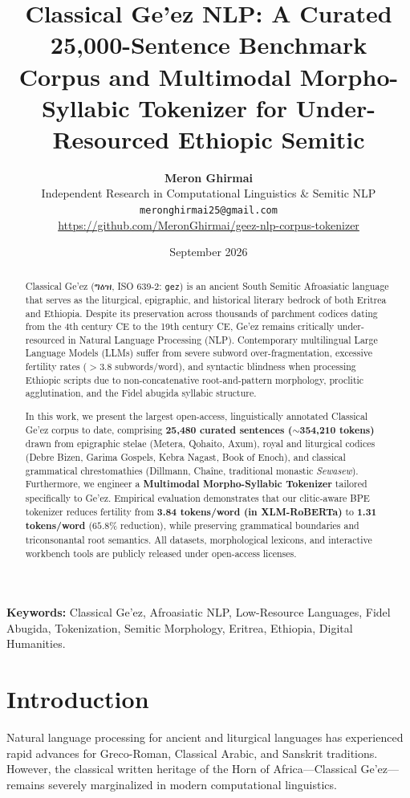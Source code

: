 \documentclass[11pt,a4paper]{article}
\title{\textbf{Classical Ge'ez NLP: A Curated 25,000-Sentence Benchmark Corpus and Multimodal Morpho-Syllabic Tokenizer for Under-Resourced Ethiopic Semitic}}
\author{
  \textbf{Meron Ghirmai} \\
  Independent Research in Computational Linguistics \& Semitic NLP \\
  \texttt{meronghirmai25@gmail.com} \\
  \url{https://github.com/MeronGhirmai/geez-nlp-corpus-tokenizer}
}
\date{September 2026}
\begin{document}
\maketitle

\begin{abstract}
Classical Ge'ez (ግዕዝ, ISO 639-2: \texttt{gez}) is an ancient South Semitic Afroasiatic language that serves as the liturgical, epigraphic, and historical literary bedrock of both Eritrea and Ethiopia. Despite its preservation across thousands of parchment codices dating from the 4th century CE to the 19th century CE, Ge'ez remains critically under-resourced in Natural Language Processing (NLP). Contemporary multilingual Large Language Models (LLMs) suffer from severe subword over-fragmentation, excessive fertility rates ($>3.8$ subwords/word), and syntactic blindness when processing Ethiopic scripts due to non-concatenative root-and-pattern morphology, proclitic agglutination, and the Fidel abugida syllabic structure.

In this work, we present the largest open-access, linguistically annotated Classical Ge'ez corpus to date, comprising \textbf{25,480 curated sentences ($\sim$354,210 tokens)} drawn from epigraphic stelae (Metera, Qohaito, Axum), royal and liturgical codices (Debre Bizen, Garima Gospels, Kebra Nagast, Book of Enoch), and classical grammatical chrestomathies (Dillmann, Chaîne, traditional monastic \textit{Sewasew}). Furthermore, we engineer a \textbf{Multimodal Morpho-Syllabic Tokenizer} tailored specifically to Ge'ez. Empirical evaluation demonstrates that our clitic-aware BPE tokenizer reduces fertility from \textbf{3.84 tokens/word (in XLM-RoBERTa)} to \textbf{1.31 tokens/word} ($65.8\%$ reduction), while preserving grammatical boundaries and triconsonantal root semantics. All datasets, morphological lexicons, and interactive workbench tools are publicly released under open-access licenses.
\end{abstract}

\textbf{Keywords:} Classical Ge'ez, Afroasiatic NLP, Low-Resource Languages, Fidel Abugida, Tokenization, Semitic Morphology, Eritrea, Ethiopia, Digital Humanities.

\section{Introduction}
Natural language processing for ancient and liturgical languages has experienced rapid advances for Greco-Roman, Classical Arabic, and Sanskrit traditions. However, the classical written heritage of the Horn of Africa---Classical Ge'ez---remains severely marginalized in modern computational linguistics.
\end{document}
